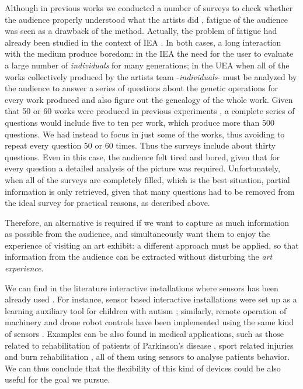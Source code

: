 \documentclass[graybox]{svmult}
\begin{document}
Although in previous works we conducted a number of surveys to check whether the audience properly understood what the artists did \cite{moreno2016analysing}, fatigue of the audience was seen as a drawback of the method.  Actually, the problem of fatigue had already been studied in the context of IEA \cite{frade2010evolution}.  In both cases, a long interaction with the medium produce boredom:  in the IEA the need for the user to evaluate a large number of \textit{individuals} for many generations;  in the UEA when all of the works collectively produced by the artists team -\textit{individuals}- must be analyzed by the audience to answer a series of questions about the genetic operations for every work produced and also figure out the genealogy of the whole work.  Given that 50 or 60 works were produced in previous experiments \cite{de2013unplugging}, \cite{de2014unplugging} a complete series of questions would include five to ten per work, which produce more than 500 questions.  We had instead to focus in just some of the works, thus avoiding to repeat every question 50 or 60 times.  Thus the surveys include about thirty questions.  Even in this case, the audience felt tired and bored, given that for every question a detailed analysis of the picture was required.  Unfortunately, when all of the surveys are completely filled, which is the best situation, partial information is only retrieved, given that many questions had to be removed from the ideal survey for practical reasons, as described above.

Therefore, an alternative is required if we want to capture as much information as possible from the audience, and simultaneously want them to enjoy the experience of visiting an art exhibit:  a different approach must be applied, so that information from the audience can be extracted without disturbing the \textit{art experience}. 

We can find in the literature interactive installations where sensors has been already used \cite{tieben2014playful}.  For instance, sensor based interactive installations were set up as a learning auxiliary tool for children with autism \cite{boutsika2014kinect}; similarly, remote operation of machinery and drone robot controls have been implemented using the same kind of sensors \cite{berra2013interfaz}. Examples can be also found in medical applications, such as those related to rehabilitation of patients of Parkinson's disease \cite{pompeu2015effect},  sport related injuries \cite{berra2013interfaz} and burn rehabilitation \cite{parry2014keeping}, all of them using sensors to analyse patients behavior.  We can thus conclude that the flexibility of this kind of devices could be also useful for the goal we pursue.
\end{document}
